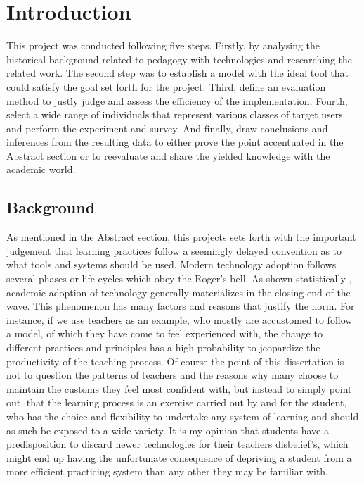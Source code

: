 \chapter{Introduction}
\label{cha:introduction}


This project was conducted following five steps. Firstly, by analysing the historical background related to pedagogy with technologies and researching the related work. The second step was to establish a model with the ideal tool that could satisfy the goal set forth for the project. Third, define an evaluation method to justly judge and assess the efficiency of the implementation. Fourth, select a wide range of individuals that represent various classes of target users and perform the experiment and survey. And finally, draw conclusions and inferences from the resulting data to either prove the point accentuated in the Abstract section or to reevaluate and share the yielded knowledge with the academic world.

\section{Background}
As mentioned in the Abstract section, this projects sets forth with the important judgement that learning practices follow a seemingly delayed convention as to what tools and systems should be used. Modern technology adoption follows several phases or life cycles which obey the Roger's bell. As shown statistically \cite{areviewoftamstudiesinthefieldofeducation}, academic adoption of technology generally materializes in the closing end of the wave. This phenomenon has many factors and reasons that justify the norm. For instance, if we use teachers as an example, who mostly are accustomed to follow a model, of which they have come to feel experienced with, the change to different practices and principles has a high probability to jeopardize the productivity of the teaching process. Of course the point of this dissertation is not to question the patterns of teachers and the reasons why many choose to maintain the customs they feel most confident with, but instead to simply point out, that the learning process is an exercise carried out by and for the student, who has the choice and flexibility to undertake any system of learning and should as such be exposed to a wide variety. It is my opinion that students have a predisposition to discard newer technologies for their teachers disbelief's, which might end up having the unfortunate consequence of depriving a student from a more efficient practicing system than any other they may be familiar with.

